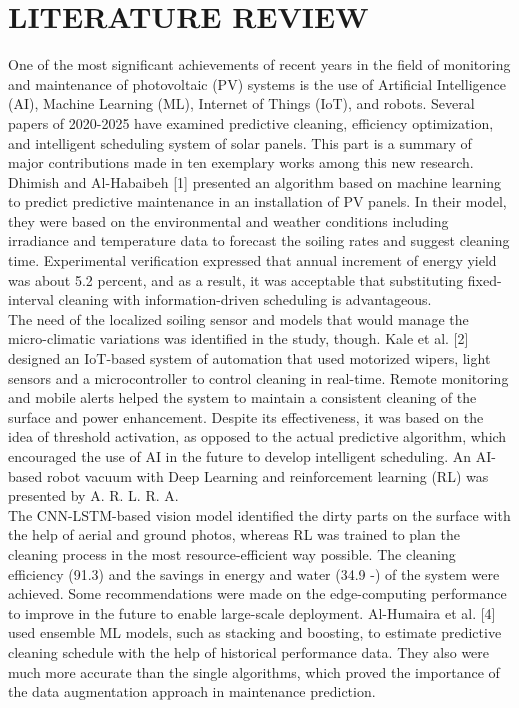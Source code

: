 \documentclass[10pt]{report}
\begin{document}
\begin{sloppypar}
{{{\begin{sloppypar}
\chapter{LITERATURE REVIEW}
\hspace{0.5cm}
One of the most significant achievements of recent years in the field of monitoring
and maintenance of photovoltaic (PV) systems is the use of Artificial Intelligence
(AI), Machine Learning (ML), Internet of Things (IoT), and robots. Several papers
of 2020-2025 have examined predictive cleaning, efficiency optimization, and intelligent scheduling system of solar panels. This part is a summary of major contributions
made in ten exemplary works among this new research. Dhimish and Al-Habaibeh
[1] presented an algorithm based on machine learning to predict predictive maintenance in an installation of PV panels. In their model, they were based on the environmental and weather conditions including irradiance and temperature data to forecast
the soiling rates and suggest cleaning time. Experimental verification expressed that
annual increment of energy yield was about 5.2 percent, and as a result, it was acceptable that substituting fixed-interval cleaning with information-driven scheduling
is advantageous.\\

The need of the localized soiling sensor and models that would
manage the micro-climatic variations was identified in the study, though. Kale et al.
[2] designed an IoT-based system of automation that used motorized wipers, light
sensors and a microcontroller to control cleaning in real-time. Remote monitoring
and mobile alerts helped the system to maintain a consistent cleaning of the surface
and power enhancement. Despite its effectiveness, it was based on the idea of threshold activation, as opposed to the actual predictive algorithm, which encouraged the
use of AI in the future to develop intelligent scheduling. An AI-based robot vacuum
with Deep Learning and reinforcement learning (RL) was presented by A. R. L. R. A. \\

The CNN-LSTM-based vision model identified
the dirty parts on the surface with the help of aerial and ground photos, whereas RL
was trained to plan the cleaning process in the most resource-efficient way possible.
The cleaning efficiency (91.3) and the savings in energy and water (34.9 -) of the
system were achieved. Some recommendations were made on the edge-computing
performance to improve in the future to enable large-scale deployment. Al-Humaira
et al. [4] used ensemble ML models, such as stacking and boosting, to estimate predictive cleaning schedule with the help of historical performance data. They also
were much more accurate than the single algorithms, which proved the importance
of the data augmentation approach in maintenance prediction. \\


\end{sloppypar}}}}
\end{sloppypar}
\end{document}
